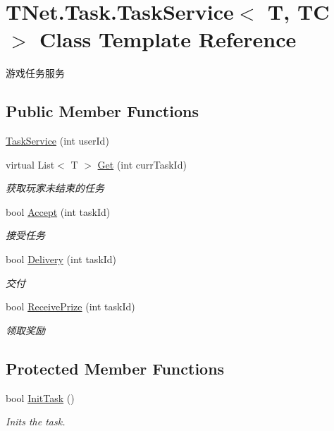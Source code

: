 \hypertarget{class_t_net_1_1_task_1_1_task_service}{}\section{T\+Net.\+Task.\+Task\+Service$<$ T, TC $>$ Class Template Reference}
\label{class_t_net_1_1_task_1_1_task_service}


游戏任务服务  


\subsection*{Public Member Functions}
\begin{DoxyCompactItemize}
\item 
\mbox{\hyperlink{class_t_net_1_1_task_1_1_task_service_add7ae97d69dfa53e3450d9325ec89c53}{Task\+Service}} (int user\+Id)
\item 
virtual List$<$ T $>$ \mbox{\hyperlink{class_t_net_1_1_task_1_1_task_service_a87bf52d031b6abdc00452653346b74d5}{Get}} (int curr\+Task\+Id)
\begin{DoxyCompactList}\small\item\em 获取玩家未结束的任务 \end{DoxyCompactList}\item 
bool \mbox{\hyperlink{class_t_net_1_1_task_1_1_task_service_a66961e472811a4fa542e61111e2a6272}{Accept}} (int task\+Id)
\begin{DoxyCompactList}\small\item\em 接受任务 \end{DoxyCompactList}\item 
bool \mbox{\hyperlink{class_t_net_1_1_task_1_1_task_service_af1fe4f5eb651a1257e735f1a16f4dfad}{Delivery}} (int task\+Id)
\begin{DoxyCompactList}\small\item\em 交付 \end{DoxyCompactList}\item 
bool \mbox{\hyperlink{class_t_net_1_1_task_1_1_task_service_a160b3a3823aaeeb214fe082d96983913}{Receive\+Prize}} (int task\+Id)
\begin{DoxyCompactList}\small\item\em 领取奖励 \end{DoxyCompactList}\end{DoxyCompactItemize}
\subsection*{Protected Member Functions}
\begin{DoxyCompactItemize}
\item 
bool \mbox{\hyperlink{class_t_net_1_1_task_1_1_task_service_a32dad4237cfce9ec978060a85f8f557e}{Init\+Task}} ()
\begin{DoxyCompactList}\small\item\em Inits the task. \end{DoxyCompactList}\end{DoxyCompactItemize}
